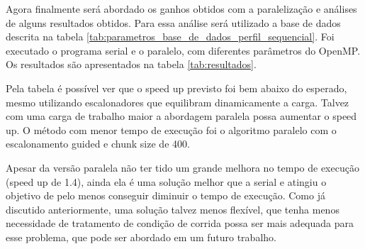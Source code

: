 \documentclass[12pt]{article}
\begin{document}
Agora finalmente será abordado os ganhos obtidos com a paralelização e análises de alguns resultados obtidos. Para essa análise será utilizado a base de dados descrita na tabela \ref{tab:parametros_base_de_dados_perfil_sequencial}. Foi executado o programa serial e o paralelo, com diferentes parâmetros do OpenMP. Os resultados são apresentados na tabela \ref{tab:resultados}.

Pela tabela é possível ver que o speed up previsto foi bem abaixo do esperado, mesmo utilizando escalonadores que equilibram dinamicamente a carga. Talvez com uma carga de trabalho maior a abordagem paralela possa aumentar o speed up. O método com menor tempo de execução foi o algoritmo paralelo com o escalonamento guided e chunk size de 400.

Apesar da versão paralela não ter tido um grande melhora no tempo de execução (speed up de 1.4), ainda ela é uma solução melhor que a serial e atingiu o objetivo de pelo menos conseguir diminuir o tempo de execução. Como já discutido anteriormente, uma solução talvez menos flexível, que tenha menos necessidade de tratamento de condição de corrida possa ser mais adequada para esse problema, que pode ser abordado em um futuro trabalho.

\end{document}
